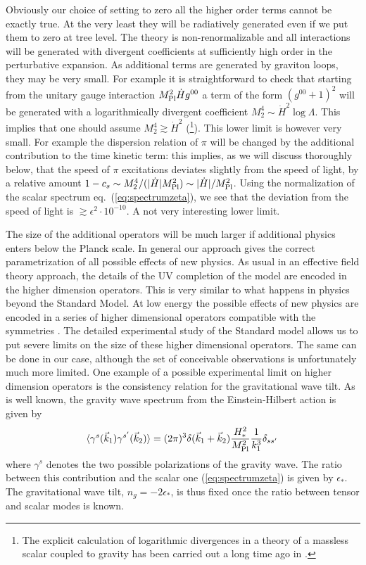\documentclass[12pt,letterpaper]{article}
\def\be{\begin{eqnarray}}
\def\ee{\end{eqnarray}}
\begin{document}
{Obviously our choice of setting to zero all the higher order terms
cannot be exactly true. At the very least they will be radiatively
generated even if we put them to zero at tree level. The theory is
non-renormalizable and all interactions will be generated with
divergent coefficients at sufficiently high order in the perturbative
expansion. As additional terms are generated by graviton loops, they
may be very small. For example it is straightforward to check that
starting from the unitary gauge interaction $M_{\rm Pl}^2 \dot H g^{00}$ a
term of the form $(g^{00}+1)^2$ will be generated with a
logarithmically divergent coefficient $M_2^4 \sim \dot H^2 \log
\Lambda$. This implies that one should assume $M^4_2 \gtrsim \dot H^2$
(\footnote{The explicit calculation of logarithmic divergences in a theory
  of a massless scalar coupled to gravity has been carried out a
  long time ago in \cite{'tHooft:1974bx}.}). This lower limit is however very small. For example the dispersion relation of $\pi$ will be changed by the additional contribution to the time kinetic term: this implies, as we will discuss thoroughly below, that the speed of $\pi$ excitations deviates slightly from the speed of light, by a relative amount $1-c_s \sim M_2^4/(|\dot H| M_{\rm Pl}^2) \sim |\dot H|/M_{\rm Pl}^2$. Using the normalization of the scalar spectrum eq.~(\ref{eq:spectrumzeta}), we see that the deviation from the speed of light is $\gtrsim \epsilon^2 \cdot 10^{-10}$. A not very interesting lower limit.

The size of the additional operators will be much larger if additional
physics enters below the Planck scale. In general our approach gives
the correct parametrization of all possible effects of new physics. As
usual in an effective field theory approach, the details of the UV
completion of the model are encoded in the higher dimension
operators. This is very similar to what happens in physics beyond the
Standard Model. At low energy the possible effects of new physics are
encoded in a series of higher dimensional operators compatible with
the symmetries \cite{Barbieri:2004qk}. The detailed experimental study of the Standard model allows us to put severe limits on the size of these higher dimensional operators. The same can be done in our case, although the set of conceivable observations is unfortunately much more limited. 
One example of a possible experimental limit on higher dimension operators is the
consistency relation for the gravitational wave tilt. As is well
known, the gravity wave spectrum from the Einstein-Hilbert action is given by 
\be
\label{eq:GWspectrum}
\langle \gamma^s(\vec k_1) \gamma^{s'}(\vec k_2)\rangle = (2 \pi)^3
\delta(\vec k_1 + \vec k_2) \frac{H_*^2}{M_{\rm Pl}^2}\frac{1}{k_1^3}
\delta_{s s'}\,
\ee 
where $\gamma^s$ denotes the two possible polarizations of the gravity
wave. The ratio between this contribution and the scalar one
(\ref{eq:spectrumzeta}) is given by $\epsilon_*$. The
gravitational wave tilt, $n_g=-2 \epsilon_*$, is thus fixed once the
ratio between tensor and scalar modes is known.

}
\end{document}
